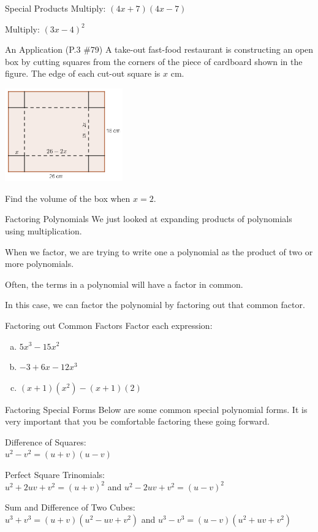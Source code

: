 \documentclass{beamer}
\newcommand{\fp}[1]{\left({#1}\right)} %
\begin{document}
\begin{frame}[t]{Special Products}
Multiply: $(4x + 7)(4x - 7)$

\pause

\vfill

Multiply: $(3x - 4)^2$
\end{frame}

\begin{frame}[t]{An Application}
(P.3 \#79) A take-out fast-food restaurant is constructing an open box by cutting squares from the corners of the piece of cardboard shown in the figure. The edge of each cut-out square is $x$ cm.

\includegraphics[width=2in]{TakeOutBox.png}

Find the volume of the box when $x = 2$.
\end{frame}

\begin{frame}[t]{Factoring Polynomials}
We just looked at expanding products of polynomials using multiplication.

When we factor, we are trying to write one a polynomial as the product of two or more polynomials.

Often, the terms in a polynomial will have a factor in common.

In this case, we can factor the polynomial by factoring out that common factor.
\end{frame}

\begin{frame}[t]{Factoring out Common Factors}
Factor each expression: \begin{enumerate}[(a)]
\item $5x^3 - 15x^2$
\item $-3 + 6x - 12x^3$
\item $(x+1)\fp{x^2} - (x+1)(2)$
\end{enumerate}
\end{frame}

\begin{frame}[t]{Factoring Special Forms}
Below are some common special polynomial forms. It is very important that you be comfortable factoring these going forward.

\pause

Difference of Squares: \\
$u^2 - v^2 = (u+v)(u-v)$

\pause

Perfect Square Trinomials: \\
$u^2 + 2uv + v^2 = (u + v)^2$ and $u^2 - 2uv + v^2 = (u - v)^2$

\pause

Sum and Difference of Two Cubes: \\
$u^3 + v^3 = (u+v)\fp{u^2 - uv + v^2}$ and $u^3 - v^3 = (u - v)\fp{u^2 + uv + v^2}$
\end{frame}
\end{document}
